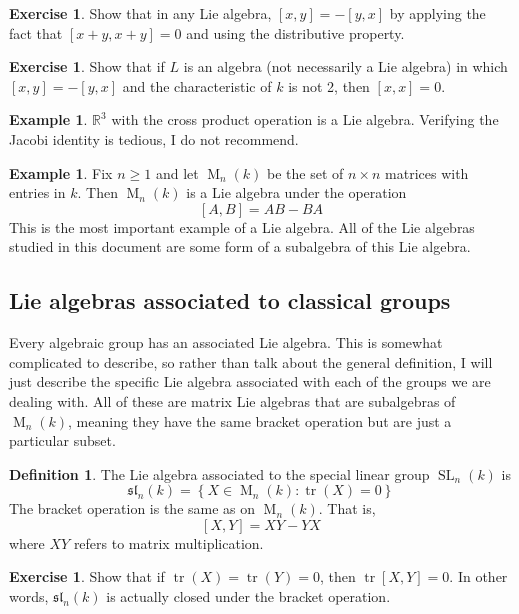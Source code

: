 \documentclass[12pt]{article}
\theoremstyle{definition}
\newtheorem{definition}[theorem]{Definition}
\newtheorem{example}[theorem]{Example}
\newtheorem{exercise}[theorem]{Exercise}
\newcommand{\R}{\mathbb{R}}
\newcommand{\lb}{\left\{}
\newcommand{\rb}{\right\}}
\DeclareMathOperator{\M}{M}
\DeclareMathOperator{\SL}{SL}
\DeclareMathOperator{\tr}{tr}
\begin{document}
\begin{exercise}
Show that in any Lie algebra, $[x,y] = -[y,x]$ by applying the fact that $[x+y,x+y]=0$ and using the distributive property.
\end{exercise}

\begin{exercise}
Show that if $L$ is an algebra (not necessarily a Lie algebra) in which $[x,y] = -[y,x]$ and the characteristic of $k$ is not 2, then $[x,x] = 0$.
\end{exercise}

\begin{example}
$\R^3$ with the cross product operation is a Lie algebra. Verifying the Jacobi identity is tedious, I do not recommend.
\end{example}

\begin{example}
Fix $n \ge 1$ and let $\M_n(k)$ be the set of $n \times n$ matrices with entries in $k$. Then $\M_n(k)$ is a Lie algebra under the operation
\[
	[A,B] = AB - BA
\]
This is the most important example of a Lie algebra. All of the Lie algebras studied in this document are some form of a subalgebra of this Lie algebra.
\end{example}

\subsection{Lie algebras associated to classical groups}

Every algebraic group has an associated Lie algebra. This is somewhat complicated to describe, so rather than talk about the general definition, I will just describe the specific Lie algebra associated with each of the groups we are dealing with. All of these are matrix Lie algebras that are subalgebras of $\M_n(k)$, meaning they have the same bracket operation but are just a particular subset.

\begin{definition}
The Lie algebra associated to the special linear group $\SL_n(k)$ is
\[
	\mathfrak{sl}_n(k) = \lb X \in \M_n(k) : \tr(X) = 0 \rb
\]
The bracket operation is the same as on $\M_n(k)$. That is,
\[
	[X,Y] = XY - YX
\]
where $XY$ refers to matrix multiplication.
\end{definition}

\begin{exercise}
Show that if $\tr(X) = \tr(Y) = 0$, then $\tr[X,Y] = 0$. In other words, $\mathfrak{sl}_n(k)$ is actually closed under the bracket operation.
\end{exercise}
\end{document}
